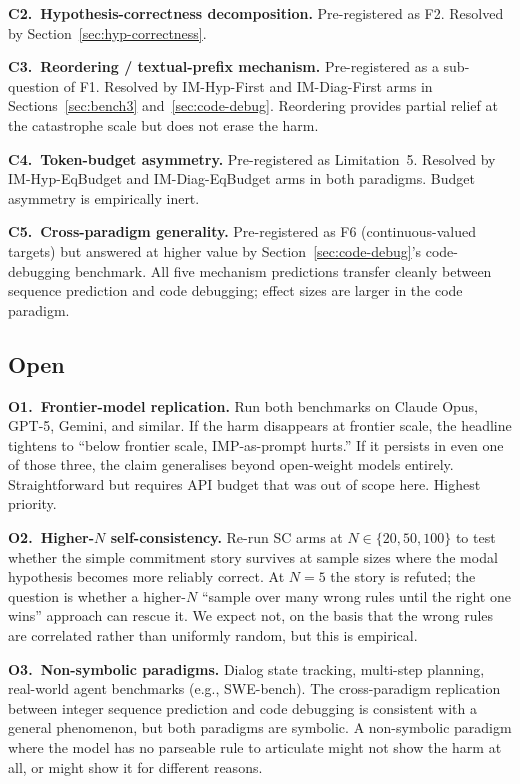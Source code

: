 \documentclass[11pt]{article}
\begin{document}
\textbf{C2.\ Hypothesis-correctness decomposition.}  Pre-registered
as F2.  Resolved by Section~\ref{sec:hyp-correctness}.

\textbf{C3.\ Reordering / textual-prefix mechanism.}  Pre-registered
as a sub-question of F1.  Resolved by IM-Hyp-First and
IM-Diag-First arms in Sections~\ref{sec:bench3}
and~\ref{sec:code-debug}.  Reordering provides partial relief at
the catastrophe scale but does not erase the harm.

\textbf{C4.\ Token-budget asymmetry.}  Pre-registered as
Limitation~5.  Resolved by IM-Hyp-EqBudget and IM-Diag-EqBudget
arms in both paradigms.  Budget asymmetry is empirically inert.

\textbf{C5.\ Cross-paradigm generality.}  Pre-registered as F6
(continuous-valued targets) but answered at higher value by
Section~\ref{sec:code-debug}'s code-debugging benchmark.  All
five mechanism predictions transfer cleanly between sequence
prediction and code debugging; effect sizes are larger in the
code paradigm.

\subsection*{Open}

\textbf{O1.\ Frontier-model replication.}  Run both benchmarks
on Claude Opus, GPT-5, Gemini, and similar.  If the harm
disappears at frontier scale, the headline tightens to ``below
frontier scale, IMP-as-prompt hurts.''  If it persists in even
one of those three, the claim generalises beyond open-weight
models entirely.  Straightforward but requires API budget that
was out of scope here.  Highest priority.

\textbf{O2.\ Higher-$N$ self-consistency.}  Re-run SC arms at
$N \in \{20, 50, 100\}$ to test whether the simple commitment
story survives at sample sizes where the modal hypothesis
becomes more reliably correct.  At $N = 5$ the story is
refuted; the question is whether a higher-$N$ ``sample over
many wrong rules until the right one wins'' approach can rescue
it.  We expect not, on the basis that the wrong rules are
correlated rather than uniformly random, but this is empirical.

\textbf{O3.\ Non-symbolic paradigms.}  Dialog state tracking,
multi-step planning, real-world agent benchmarks (e.g., SWE-bench).
The cross-paradigm replication between integer sequence
prediction and code debugging is consistent with a general
phenomenon, but both paradigms are symbolic.  A non-symbolic
paradigm where the model has no parseable rule to articulate
might not show the harm at all, or might show it for different
reasons.
\end{document}
